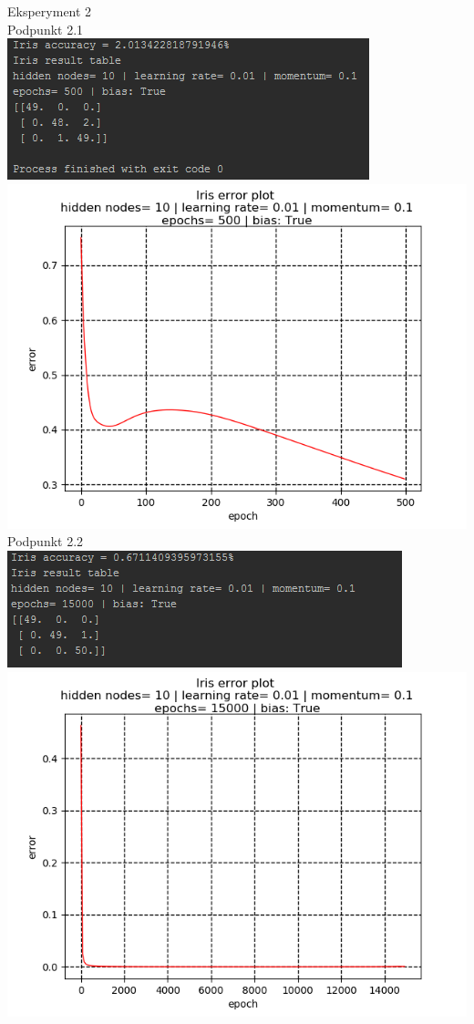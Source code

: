 \documentclass{classrep}
\begin{document}
{Eksperyment 2\\
Podpunkt 2.1\\
\includegraphics{imgs/211.png}\\
\includegraphics{imgs/212.png}\\
Podpunkt 2.2\\
\includegraphics{imgs/221.png}\\
\includegraphics{imgs/222.png}\\
}
\end{document}
